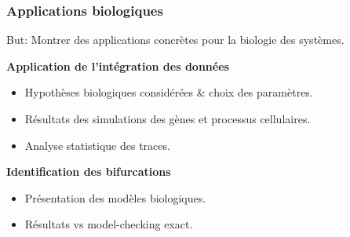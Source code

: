 
\begin{frame}[c]
 \frametitle{Applications biologiques}
 
 But: Montrer des applications concrètes pour la biologie des systèmes. 
 
 \medskip
 
 \textbf{Application de l'intégration des données}
 \begin{itemize}
  \item Hypothèses biologiques considérées \& choix des paramètres.
  \item Résultats des simulations des gènes et processus cellulaires.
  \item Analyse statistique des traces.
 \end{itemize}
 
 \medskip
\pause
\textbf{Identification des bifurcations}
\begin{itemize}
 \item Présentation des modèles biologiques.
 \item Résultats vs model-checking exact.
\end{itemize}

\end{frame}
